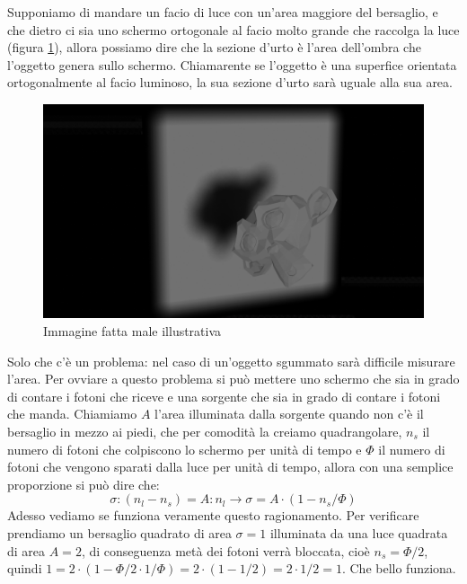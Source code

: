 \documentclass[11pt,a4paper]{article}
\begin{document}
		Supponiamo di mandare un facio di luce con un'area maggiore del bersaglio, e che dietro ci sia uno schermo ortogonale al facio molto grande che raccolga la luce (figura \ref{fig:ombra}), allora possiamo dire che la sezione d'urto è l'area dell'ombra che l'oggetto genera sullo schermo.\newline
		Chiamarente se l'oggetto è una superfice orientata ortogonalmente al facio luminoso, la sua sezione d'urto sarà uguale alla sua area.\newline
		\begin{figure}
			\centering
    		\includegraphics[width=\linewidth]{Immagini/ombra_con_blender.png}
    		\caption{Immagine fatta male illustrativa}
    		\label{fig:ombra}
		\end{figure}

		Solo che c'è un problema: nel caso di un'oggetto sgummato sarà difficile misurare l'area. Per ovviare a questo problema si può mettere uno schermo che sia in grado di contare i fotoni che riceve e una sorgente che sia in grado di contare i fotoni che manda.\newline
		Chiamiamo $A$ l'area illuminata dalla sorgente quando non c'è il bersaglio in mezzo ai piedi, che per comodità la creiamo quadrangolare, $n_s$ il numero di fotoni che colpiscono lo schermo per unità di tempo e $\Phi$ il numero di fotoni che vengono sparati dalla luce per unità di tempo, allora con una semplice proporzione si può dire che:
		\begin{equation}
			\sigma:(n_l-n_s)=A:n_l \rightarrow \sigma=A\cdot(1-n_s/\Phi)
			\label{eq:sigma_luce}
		\end{equation}
		Adesso vediamo se funziona veramente questo ragionamento.\newline
		Per verificare prendiamo un bersaglio quadrato di area $\sigma=1$ illuminata da una luce quadrata di area $A=2$, di conseguenza metà dei fotoni verrà bloccata, cioè $n_s=\Phi/2$, quindi $1=2\cdot(1-\Phi/2\cdot 1/\Phi)=2\cdot(1-1/2)=2\cdot 1/2=1$.\newline
		Che bello funziona.\newline
\end{document}
